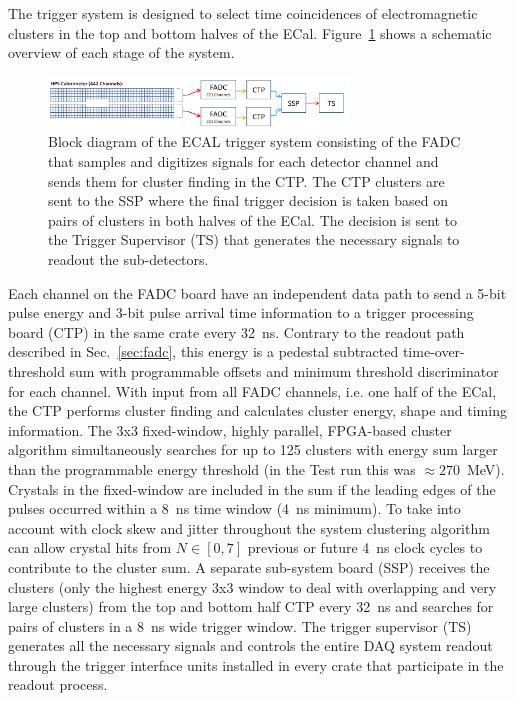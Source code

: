 \documentclass[final,3p,times,twocolumn]{elsarticle}
\begin{document}
The trigger system is designed to select time coincidences of electromagnetic clusters in the 
top and bottom halves of the ECal. Figure~\ref{fig:hps_trigger_cal} shows a schematic overview 
of each stage of the system. 
 \begin{figure}[b]
\begin{center}
{\small
 \includegraphics[width=8cm]{figures/hps_trigger_cal}
\caption{Block diagram of the ECAL trigger system consisting of the FADC that samples and digitizes 
signals for each detector channel and sends them for cluster finding in the CTP. The CTP clusters are 
sent to the SSP where the final trigger decision is taken based on pairs of clusters in both halves of the 
ECal. The decision is sent to the Trigger Supervisor (TS) that generates the necessary signals to readout 
the sub-detectors.}
 \label{fig:hps_trigger_cal}
}
\end{center}
 \end{figure}
Each channel on the FADC board have an 
independent data path to send a 5-bit pulse energy and 3-bit pulse arrival time information to a 
trigger processing board (CTP) in the same crate every 32~ns. Contrary to the readout path 
described in Sec.~\ref{sec:fadc}, this energy is a pedestal subtracted time-over-threshold sum with 
programmable offsets and minimum threshold discriminator for each channel. With input from all 
FADC channels, i.e. one half of the ECal, the CTP performs cluster finding and calculates cluster 
energy, shape and timing information. The 3x3 fixed-window, highly parallel, FPGA-based cluster 
algorithm simultaneously searches for up to 125 clusters with energy sum larger than 
the programmable energy threshold (in the Test run this was $\approx270$~MeV). Crystals in the 
fixed-window are included in the sum if the leading edges of the pulses occurred within a 8~ns time 
window (4~ns minimum). To take into account with clock skew and jitter throughout the system 
clustering algorithm can allow crystal hits from $N\in[0,7]$ previous or future 4~ns clock cycles to 
contribute to the cluster sum.  A separate sub-system board (SSP) receives the clusters (only the 
highest energy 3x3 window to deal with overlapping and very large clusters) from 
the top and bottom half CTP every 32~ns and searches for pairs of clusters in a 8~ns wide 
trigger window. The trigger supervisor (TS) generates all the necessary signals and controls the 
entire DAQ system readout through the trigger interface units installed in every crate that participate 
in the readout process. 
\end{document}
